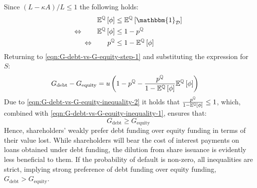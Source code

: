 \documentclass[../main.tex]{subfiles}
\begin{document}
        Since $(L-\kappa A) / L \leq 1$ the following holds:
            \begin{align}
                    \mathbb{E}^{\rnmeasure}\left[\phi\right]
                &\leq
                    \mathbb{E}^{\rnmeasure}\left[\mathbbm{1}_{\mathcal{D}} \right]
                \nonumber \\
                \Leftrightarrow 
                \qquad
                    \mathbb{E}^{\rnmeasure}\left[\phi\right]
                &\leq
                    1 - p^{\rnmeasure}
                \label{eqn:G-debt-vs-G-equity-inequality-1}
                \\
                \Leftrightarrow 
                \qquad
                p^{\rnmeasure}
                &\leq 
                1 - \mathbb{E}^{\rnmeasure}\left[\phi\right]
                \label{eqn:G-debt-vs-G-equity-inequality-2}
            \end{align}
        Returning to \cref{eqn:G-debt-vs-G-equity-step-1} and substituting the expression for $S$:
            \begin{align}
                G_{\text{debt}}
                -
                G_{\text{equity}}
                &=
                    u \left(
                        1
                        -
                        p^{\mathbb{Q}}
                        -
                        \frac{
                            p^{\mathbb{Q}}
                        }{
                            1
                            -
                            \mathbb{E}^{\mathbb{Q}}\left[\phi\right]
                        } 
                        \mathbb{E}^{\mathbb{Q}}\left[\phi\right]
                    \right)
            \end{align}
        Due to \cref{eqn:G-debt-vs-G-equity-inequality-2} it holds that
        $\frac{p^{\mathbb{Q}}}{1-\mathbb{E}^{\mathbb{Q}}\left[\phi\right]} \leq 1$,
        which, combined with \cref{eqn:G-debt-vs-G-equity-inequality-1}, ensures that:
            \begin{equation}
                G_{\text{debt}}
                \geq 
                G_{\text{equity}}
                \label{eqn:G-debt-vs-G-equity}
            \end{equation}
        Hence, shareholders' weakly prefer debt funding over equity funding in terms of their value lost.
        While shareholders will bear the cost of interest payments on loans obtained under debt funding,
        the dilution from share issuance is evidently less beneficial to them. 
        If the probability of default is non-zero, all inequalities are strict,
        implying strong preference of debt funding over equity funding, $G_{\text{debt}} > G_{\text{equity}}$.
        
\end{document}

